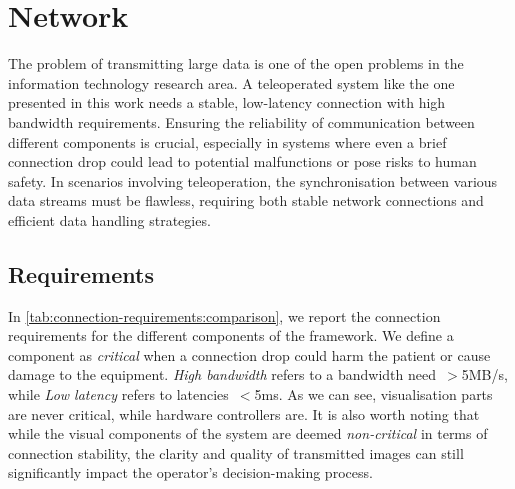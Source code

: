 \cleardoublepage
\chapter{Network}

The problem of transmitting large data is one of the open problems in the information technology research area. A teleoperated system like the one presented in this work needs a stable, low-latency connection with high bandwidth requirements. Ensuring the reliability of communication between different components is crucial, especially in systems where even a brief connection drop could lead to potential malfunctions or pose risks to human safety. In scenarios involving teleoperation, the synchronisation between various data streams must be flawless, requiring both stable network connections and efficient data handling strategies.
\section{Requirements}
In \autoref{tab:connection-requirements:comparison}, we report the connection requirements for the different components of the framework. We define a component as \textit{critical} when a connection drop could harm the patient or cause damage to the equipment. \textit{High bandwidth} refers to a bandwidth need~$>$5MB/s, while \textit{Low latency} refers to latencies~$<$5ms. As we can see, visualisation parts are never critical, while hardware controllers are. It is also worth noting that while the visual components of the system are deemed \textit{non-critical} in terms of connection stability, the clarity and quality of transmitted images can still significantly impact the operator's decision-making process.
\newcommand{\cmark}{\ding{51}}%
\newcommand{\xmark}{\ding{55}}%

